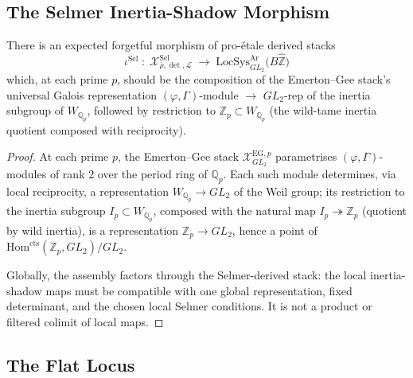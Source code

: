 \subsection{The Selmer Inertia-Shadow Morphism}

\begin{proposition}
\label{v4-arith:bzn:prop:EG-to-LocSys}
There is an expected forgetful morphism of
pro-\'etale derived stacks
\begin{equation}
\label{v4-arith:bzn:eq:EG-morphism}
\iota^{\mathrm{Sel}}\;\colon\;\mathcal{X}^{\mathrm{Sel}}_{\bar\rho,\det,\mathcal{L}}\;\longrightarrow\;\mathrm{LocSys}^{\mathrm{Ar}}_{GL_{2}}\bigl(B\widehat{\mathbb{Z}}\bigr)
\end{equation}
which, at each prime \(p\), should be the composition of the
Emerton--Gee stack's universal Galois representation
\((\varphi,\Gamma)\)-module \(\to\) \(GL_{2}\)-rep of the inertia
subgroup of \(W_{\mathbb{Q}_{p}}\), followed by restriction to
\(\mathbb{Z}_{p}\subset W_{\mathbb{Q}_{p}}\) (the wild-tame inertia
quotient composed with reciprocity).
\end{proposition}

\begin{proof}
At each prime \(p\), the Emerton--Gee stack
\(\mathcal{X}^{\mathrm{EG},p}_{GL_{2}}\) parametrises \((\varphi,\Gamma)\)-modules
of rank \(2\) over the period ring of \(\mathbb{Q}_{p}\). Each such
module determines, via local reciprocity, a representation
\(W_{\mathbb{Q}_{p}}\to GL_{2}\) of the Weil group; its restriction
to the inertia subgroup \(I_{p}\subset W_{\mathbb{Q}_{p}}\), composed
with the natural map \(I_{p}\twoheadrightarrow\mathbb{Z}_{p}\)
(quotient by wild inertia), is a representation
\(\mathbb{Z}_{p}\to GL_{2}\), hence a point of
\(\mathrm{Hom}^{\mathrm{cts}}(\mathbb{Z}_{p},GL_{2})/GL_{2}\).

Globally, the assembly factors through the Selmer-derived stack:
the local inertia-shadow maps must be compatible with one global
representation, fixed determinant, and the chosen local Selmer
conditions. It is not a product or filtered colimit of local maps.
\end{proof}

\subsection{The Flat Locus}

